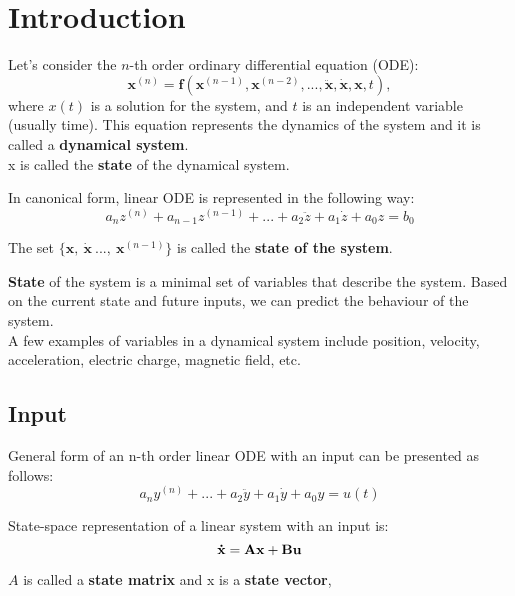 
\section{Introduction}
\begin{tcolorbox}[colback=green!10,colframe=green!50!black,title=\textbf{Dynamical systems}]
    Let's consider the \(n\)-th order ordinary differential equation (ODE):
    \[
    \mathbf{x}^{(n)} = \mathbf{f}(\mathbf{x}^{(n-1)}, \mathbf{x}^{(n-2)}, ..., \ddot{\mathbf{x}}, \dot{\mathbf{x}}, \mathbf{x}, t),
    \]
    where \(x(t)\) is a solution for the system, and \(t\) is an independent variable (usually time).
    This equation represents the dynamics of the system and it is called a \textbf{dynamical system}.\\
    x is called the \textbf{state} of the dynamical system.
\end{tcolorbox}


In canonical form, linear ODE is represented in the following way:
\[a_{n}z^{(n)} +a_{n-1}z^{(n-1)}+...+a_{2}\ddot z+a_{1}\dot z + a_0 z= b_0\]

The set $\{ \mathbf{x}, \ \dot{\mathbf{x}} \ ..., \ \mathbf{x}^{(n-1)} \}$ is called the \textbf{state  of the system}.

\textbf{State} of the system is a minimal set of variables that describe the system. Based on the current state and future inputs,
we can predict the behaviour of the system. \\

A few examples of variables in a dynamical system include position, velocity, acceleration, electric charge, magnetic field, etc.

\subsection{Input}
General form of an n-th order linear ODE with an input can be presented as follows:
%
\begin{equation}
    a_n y^{(n)} + 
    ... +
    a_2 \ddot{y} + a_1 \dot{y} + 
    a_0 y = u(t)
\end{equation}

\bigskip

State-space representation of a linear system with an input is:
%
\begin{equation}
    \mathbf{\dot{x}} =\mathbf{A}\mathbf{x} + \mathbf{B}\mathbf{u} \\
\end{equation}

$A$ is called a \textbf{state matrix} and x is a \textbf{state vector}, 

